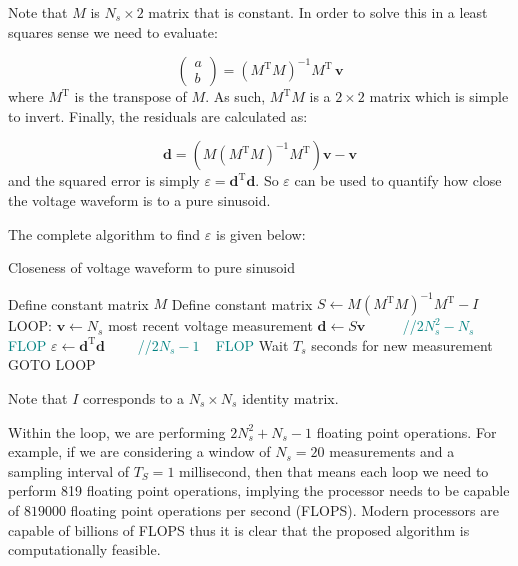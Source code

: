\documentclass[11pt,a4paper,]{article}
\begin{document}
\begin{appendices}
Note that $M$ is $N_s\times 2$ matrix that is constant. In order to solve this in a least squares sense we need to evaluate:

$$
\begin{pmatrix}
a \\ b
\end{pmatrix} = \left(M^\mathrm{T}M\right)^{-1}M^\mathrm{T}\,\bm{v}
$$
where $M^\mathrm{T}$ is the transpose of $M$. As such, $M^\mathrm{T}M$ is a $2\times 2$ matrix which is simple to invert. Finally, the residuals are calculated as:

$$
\bm{d} = \left(M\left(M^\mathrm{T}M\right)^{-1}M^\mathrm{T}\right)\bm{v} - \bm{v}
$$
and the squared error is simply $\varepsilon = \bm{d}^\mathrm{T}\bm{d}$. So $\varepsilon$ can be used to quantify how close the voltage waveform is to a pure sinusoid.

The complete algorithm to find $\varepsilon$ is given below:

\begin{algorithm}
\caption{Closeness of voltage waveform to pure sinusoid}\label{alg:cap}

\begin{algorithmic}
\State Define constant matrix $M$ 
\State Define constant matrix $S\leftarrow M\left(M^\mathrm{T}M\right)^{-1}M^\mathrm{T} - I$
\State LOOP:
\State $\bm{v}\leftarrow N_s$ most recent voltage measurement
\State $\bm{d}\leftarrow S\bm{v}\quad\quad\,\,$ \textcolor{teal}{//$2N_s^2-N_s$ FLOP}
\State $\varepsilon\leftarrow \bm{d}^\mathrm{T}\bm{d}\quad\quad$ \textcolor{teal}{//$2N_s-1\,\,\,\,\,$ FLOP}
\State Wait $T_s$ seconds for new measurement
\State GOTO LOOP
\end{algorithmic}
\end{algorithm}

Note that $I$ corresponds to a $N_s\times N_s$ identity matrix.

Within the loop, we are performing $2N_s^2 + N_s -1$ floating point operations. For example, if we are considering a window of $N_s=20$ measurements and a sampling interval of $T_S = 1$ millisecond, then that means each loop we need to perform 819 floating point operations, implying the processor needs to be capable of $819000$ floating point operations per second (FLOPS). Modern processors are capable of billions of FLOPS thus it is clear that the proposed algorithm is computationally feasible.


\end{appendices}
\end{document}
